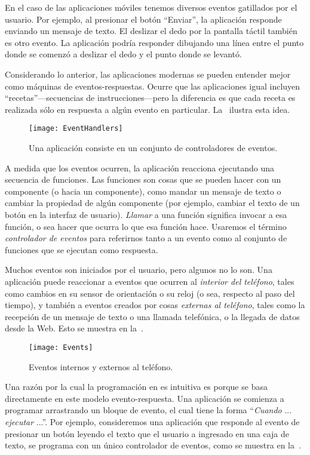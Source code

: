 En el caso de las aplicaciones móviles tenemos diversos eventos
gatillados por el usuario. Por ejemplo, al presionar el botón
``Enviar'', la aplicación responde enviando un mensaje de texto. El
deslizar el dedo por la pantalla táctil también es otro evento. La
aplicación podría responder dibujando una línea entre el punto donde
se comenzó a deslizar el dedo y el punto donde se levantó.

Considerando lo anterior, las aplicaciones modernas se pueden entender
mejor como máquinas de eventos-respuestas. Ocurre que las aplicaciones
igual incluyen “recetas”—secuencias de instrucciones—pero la
diferencia es que cada receta es realizada sólo en respuesta a algún
evento en particular. La~ ilustra esta idea.

\begin{figure}[H]
\centering
\texttt{[image: EventHandlers]}
\caption{Una aplicación consiste en un conjunto de controladores de eventos.}
\label{fig:eventHandlers}
\end{figure}

A medida que los eventos ocurren, la aplicación reacciona ejecutando
una secuencia de funciones. Las funciones son cosas que se pueden
hacer con un componente (o hacia un componente), como mandar un
mensaje de texto o cambiar la propiedad de algún componente (por
ejemplo, cambiar el texto de un botón en la interfaz de
usuario). \emph{Llamar} a una función significa invocar a esa función,
o sea hacer que ocurra lo que esa función hace. Usaremos el término
\emph{controlador de eventos} para referirnos tanto a un evento como
al conjunto de funciones que se ejecutan como respuesta.

Muchos eventos son iniciados por el usuario, pero algunos no lo
son. Una aplicación puede reaccionar a eventos que ocurren al
\emph{interior del teléfono}, tales como cambios en su sensor de
orientación o su reloj (o sea, respecto al paso del tiempo), y también
a eventos creados por cosas \emph{externas al teléfono}, tales como la
recepción de un mensaje de texto o una llamada telefónica, o la
llegada de datos desde la Web. Esto se muestra en
la~.

\begin{figure}[H]
\centering
\texttt{[image: Events]}
\caption{Eventos internos y externos al teléfono.}
\label{fig:events}
\end{figure}

Una razón por la cual la programación en \AppInventor es intuitiva es
porque se basa directamente en este modelo evento-respuesta. Una
aplicación se comienza a programar arrastrando un bloque de evento, el
cual tiene la forma ``\emph{Cuando} ... \emph{ejecutar} ...''. Por ejemplo,
consideremos una aplicación que responde al evento de presionar un
botón leyendo el texto que el usuario a ingresado en una caja de
texto, se programa con un único controlador de eventos, como se
muestra en la~.

